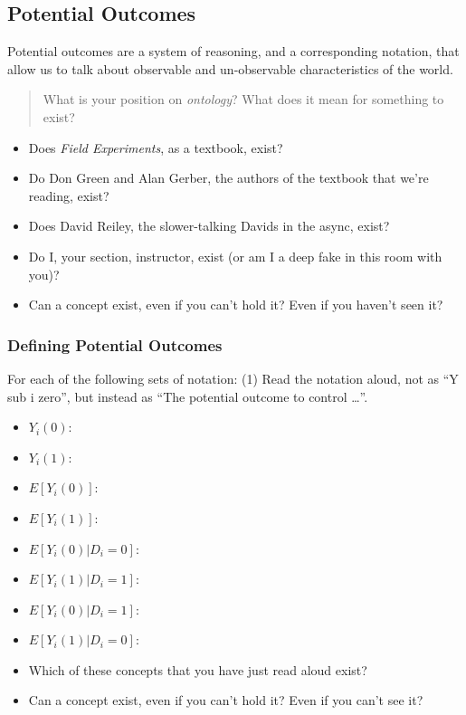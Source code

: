 \documentclass[
]{article}
\providecommand{\tightlist}{%
  \setlength{\itemsep}{0pt}\setlength{\parskip}{0pt}}
\begin{document}
\hypertarget{potential-outcomes}{%
\subsection{Potential Outcomes}\label{potential-outcomes}}

Potential outcomes are a system of reasoning, and a corresponding notation, that allow us to talk about observable and un-observable characteristics of the world.

\begin{quote}
What is your position on \emph{ontology}? What does it mean for something to exist?
\end{quote}

\begin{itemize}
\tightlist
\item
  Does \emph{Field Experiments}, as a textbook, exist?
\item
  Do Don Green and Alan Gerber, the authors of the textbook that we're reading, exist?
\item
  Does David Reiley, the slower-talking Davids in the async, exist?
\item
  Do I, your section, instructor, exist (or am I a deep fake in this room with you)?
\item
  Can a concept exist, even if you can't hold it? Even if you haven't seen it?
\end{itemize}

\hypertarget{defining-potential-outcomes}{%
\subsubsection{Defining Potential Outcomes}\label{defining-potential-outcomes}}

For each of the following sets of notation: (1) Read the notation aloud, not as ``Y sub i zero'', but instead as ``The potential outcome to control \ldots{}''.

\begin{itemize}
\item
  \(Y_{i}(0)\):
\item
  \(Y_{i}(1)\):\\
\item
  \(E[Y_{i}(0)]\):
\item
  \(E[Y_{i}(1)]\):
\item
  \(E[Y_{i}(0)|D_{i}=0]\):
\item
  \(E[Y_{i}(1)|D_{i}=1]\):
\item
  \(E[Y_{i}(0)|D_{i}=1]\):
\item
  \(E[Y_{i}(1)|D_{i}=0]\):
\item
  Which of these concepts that you have just read aloud exist?
\item
  Can a concept exist, even if you can't hold it? Even if you can't see it?
\end{itemize}
\end{document}
